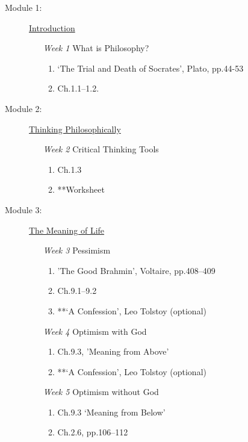 \documentclass[article,oneside]{memoir}
\begin{document}
\begin{description}

\item[Module 1:] \href{http://scoconno.github.io/Teaching/Examined/Intro/}{Introduction}
\begin{enumerate}
\item[\textit{Week 1}] What is Philosophy?
\begin{enumerate}
\item `The Trial and Death of Socrates', Plato, pp.44-53
\item Ch.1.1--1.2.
\end{enumerate}
\end{enumerate}

\item[Module 2:] \href{http://scoconno.github.io/Teaching/Examined/CT/}{Thinking Philosophically}
\begin{enumerate}
\item[\textit{Week 2}] Critical Thinking Tools 
\begin{enumerate}
\item Ch.1.3
\item **Worksheet
\end{enumerate}
\end{enumerate}

\item[Module 3:] \href{http://scoconno.github.io/Teaching/Examined/Meaning/}{The Meaning of Life}

\begin{enumerate}
\item[\textit{Week 3}] Pessimism 
\begin{enumerate}
\item 'The Good Brahmin', Voltaire, pp.408--409
\item Ch.9.1--9.2 
\item **`A Confession', Leo Tolstoy (optional)
\end{enumerate}

\item[\textit{Week 4}] Optimism with God
\begin{enumerate}
\item Ch.9.3, 'Meaning from Above'
\item **`A Confession', Leo Tolstoy (optional)

\end{enumerate}

\item[\textit{Week 5}] Optimism without God
\begin{enumerate}
\item Ch.9.3 `Meaning from Below'
\item Ch.2.6, pp.106--112
\end{enumerate}
\end{enumerate}



\end{description}
\end{document}
